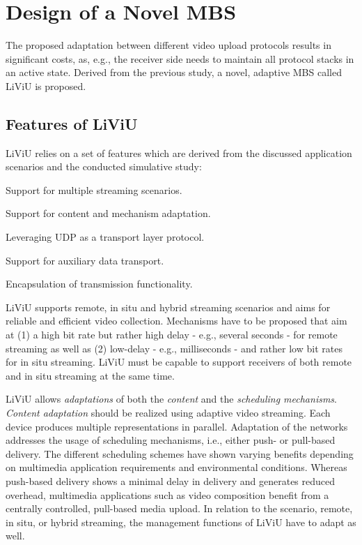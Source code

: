 \section{Design of a Novel MBS}
\label{sec:522_Liviu}
The proposed adaptation between different video upload protocols results in significant costs, as, e.g., the receiver side needs to maintain all protocol stacks in an active state.
Derived from the previous study, a novel, adaptive \ac{MBS} called \ac{LiViU} is proposed.
\subsection{Features of LiViU}
\ac{LiViU} relies on a set of features which are derived from the discussed application scenarios and the conducted simulative study:
\begin{DesignPrinciples}
\item Support for multiple streaming scenarios.
\item Support for content and mechanism adaptation.
\item Leveraging \ac{UDP} as a transport layer protocol.
\item Support for auxiliary data transport.
\item Encapsulation of transmission functionality. 
\end{DesignPrinciples} 

\ac{LiViU} supports remote, in situ and hybrid streaming scenarios and aims for reliable and efficient video collection. 
Mechanisms have to be proposed that aim at (1) a high bit rate but rather high delay - e.g., several seconds -  for remote streaming as well as (2) low-delay - e.g., milliseconds - and rather low bit rates for in situ streaming.
\ac{LiViU} must be capable to support receivers of both remote and in situ streaming at the same time.

\ac{LiViU} allows \emph{adaptations} of both the \emph{content} and the \emph{scheduling mechanisms}.
\emph{Content adaptation} should be realized using adaptive video streaming.
Each device produces multiple representations in parallel.
Adaptation of the networks addresses the usage of scheduling mechanisms, i.e., either push- or pull-based delivery.
The different scheduling schemes have shown varying benefits depending  on multimedia application requirements and environmental conditions.
Whereas push-based delivery shows a minimal delay in delivery and generates reduced overhead, multimedia applications such as video composition benefit from a centrally controlled, pull-based media upload.
In relation to the scenario, remote, in situ, or hybrid streaming, the management functions of \ac{LiViU} have to adapt as well.

